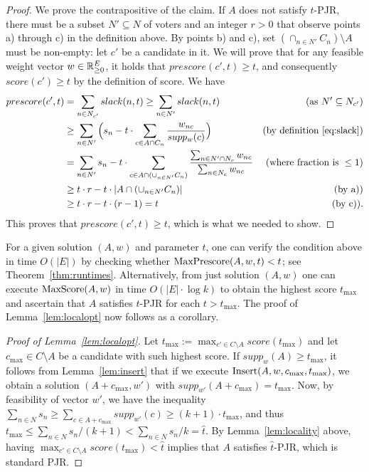 \begin{proof} 
We prove the contrapositive of the claim. If $A$ does not satisfy $t$-PJR, there must be a subset $N'\subseteq N$ of voters and an integer $r>0$ that observe points a) through c) in the definition above. By points b) and c), set $(\cap_{n\in N'} C_n)\setminus A$ must be non-empty: let $c'$ be a candidate in it. 
We will prove that for any feasible weight vector $w\in \mathbb{R}_{\geq 0}^E$, it holds that $prescore(c',t)\geq t$, and consequently $score(c')\geq t$ by the definition of score. We have
%
\begin{align*} 
prescore(c',t) &= \sum_{n\in N_{c'}}  slack(n,t) \geq \sum_{n\in N'} slack(n,t) & (\text{as } N'\subseteq N_{c'}) \\
&\geq \sum_{n\in N'} \Big(s_n - t\cdot \sum_{c\in A\cap C_n} \frac{w_{nc}}{supp_w(c)}\Big)  
& (\text{by definition \ref{eq:slack}})\\
&= \sum_{n\in N'} s_n - t \cdot \sum_{c\in A\cap (\cup_{n\in N'} C_n)} 
\frac{\sum_{n\in N'\cap N_c} w_{nc}}{\sum_{n\in N_c} w_{nc}} 
& (\text{where fraction is } \leq 1)\\ 
& \geq t\cdot r - t\cdot |A\cap (\cup_{n\in N'} C_n)| & (\text{by a)})\\
& \geq t\cdot r - t\cdot (r-1) = t & (\text{by c)}). 
\end{align*}
%
This proves that $prescore(c',t) \geq t$, which is what we needed to show.
\end{proof}

For a given solution $(A,w)$ and parameter $t$, one can verify the condition above in time $O(|E|)$ by checking whether $\operatorname{MaxPrescore}(A,w,t)<t$; see Theorem~\ref{thm:runtimes}. Alternatively, from just solution $(A,w)$ one can execute $\operatorname{MaxScore}(A,w)$ in time $O(|E|\cdot \log k)$ to obtain the highest score $t_{\max}$ and ascertain that $A$ satisfies $t$-PJR for each $t>t_{\max}$. 
The proof of Lemma~\ref{lem:localopt} now follows as a corollary.

\begin{proof}[Proof of Lemma~\ref{lem:localopt}]
Let $t_{\max}:=\max_{c'\in C\setminus A} score(t_{\max})$ and let $c_{\max}\in C\setminus A$ be a candidate with such highest score. 
If $supp_w(A)\geq t_{\max}$, it follows from Lemma~\ref{lem:insert} that if we execute $\operatorname{Insert}(A,w,c_{\max}, t_{\max})$, we obtain a solution $(A+c_{\max}, w')$ with $supp_{w'}(A+c_{\max})=t_{\max}$. 
Now, by feasibility of vector $w'$, we have the inequality $\sum_{n\in N} s_n \geq \sum_{c\in A+c_{\max}} supp_{w'}(c) \geq (k+1)\cdot t_{\max}$, and thus $t_{\max}\leq \sum_{n\in N} s_n / (k+1) < \sum_{n\in N} s_n / k = \hat{t}$. 
By Lemma~\ref{lem:locality} above, having $\max_{c'\in C\setminus A} score(t_{\max}) < \hat{t}$ implies that $A$ satisfies $\hat{t}$-PJR, which is standard PJR.
\end{proof}

